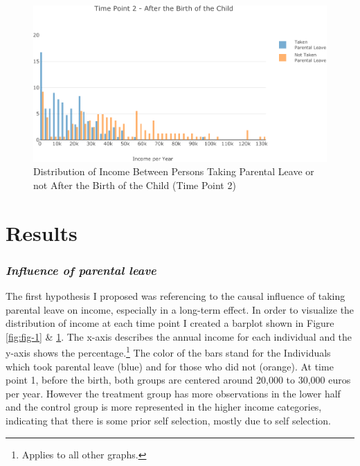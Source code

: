 \documentclass[
  12pt,
]{article}
\begin{document}
\begin{figure}

{\centering \includegraphics{Parental_Leave-Finalizing-Data-Set_files/figure-latex/fig-2-1} 

}

\caption{Distribution of Income Between Persons Taking Parental Leave or not After the Birth of the Child (Time Point 2)}\label{fig:fig-2}
\end{figure}

\hypertarget{results}{%
\section{Results}\label{results}}

\hypertarget{influence-of-parental-leave}{%
\subsubsection*{\texorpdfstring{\emph{Influence of parental leave}}{Influence of parental leave}}\label{influence-of-parental-leave}}

The first hypothesis I proposed was referencing to the causal influence of taking parental leave on income, especially in a long-term effect. In order to visualize the distribution of income at each time point I created a barplot shown in Figure \ref{fig:fig-1} \& \ref{fig:fig-2}. The x-axis describes the annual income for each individual and the y-axis shows the percentage.\footnote{Applies to all other graphs.} The color of the bars stand for the Individuals which took parental leave (blue) and for those who did not (orange). At time point 1, before the birth, both groups are centered around 20,000 to 30,000 euros per year. However the treatment group has more observations in the lower half and the control group is more represented in the higher income categories, indicating that there is some prior self selection, mostly due to self selection.
\end{document}
